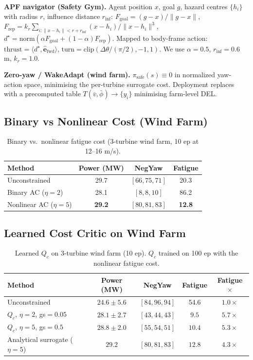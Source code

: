 \documentclass{article}
\begin{document}
\textbf{APF navigator (Safety Gym).}
Agent position $x$, goal $g$, hazard centres $\{h_i\}$ with radius $r$, influence distance $r_{\mathrm{inf}}$:
$F_{\mathrm{goal}}=(g-x)/\|g-x\|$, $F_{\mathrm{rep}}=k_r\sum_{i:\|x-h_i\|<r+r_{\mathrm{inf}}}(x-h_i)/\|x-h_i\|^3$, $d^\star=\mathrm{norm}(\alpha F_{\mathrm{goal}} + (1-\alpha)F_{\mathrm{rep}})$.
Mapped to body-frame action: $\mathrm{thrust}=\langle d^\star,\hat{\mathbf{e}}_{\mathrm{fwd}}\rangle$, $\mathrm{turn}=\mathrm{clip}(\Delta\theta/(\pi/2),-1,1)$.
We use $\alpha\!=\!0.5$, $r_{\mathrm{inf}}\!=\!0.6$ m, $k_r\!=\!1.0$.

\textbf{Zero-yaw / WakeAdapt (wind farm).}
$\pi_{\mathrm{safe}}(s)\equiv 0$ in normalized yaw-action space, minimising the per-turbine surrogate cost.
Deployment replaces with a precomputed table $T(\bar v,\bar\phi)\to\{y_i\}$ minimising farm-level DEL.

\subsection{Binary vs Nonlinear Cost (Wind Farm)}
\label{app:nonlinear}

\begin{table}[h]
\centering
\caption{Binary vs.\ nonlinear fatigue cost (3-turbine wind farm, 10 ep at 12--16 m/s).}
\label{tab:nonlinear}
\begin{tabular}{lccc}
\toprule
Method & Power (MW) & NegYaw & Fatigue \\
\midrule
Unconstrained                & 29.7 & $[66,75,71]$ & 20.3 \\
Binary AC ($\eta\!=\!2$)     & 28.1 & $[8,8,10]$   & 86.2 \\
Nonlinear AC ($\eta\!=\!5$)  & \textbf{29.2} & $[80,81,83]$ & \textbf{12.8} \\
\bottomrule
\end{tabular}
\end{table}

\subsection{Learned Cost Critic on Wind Farm}

\begin{table}[h]
\centering
\caption{Learned $Q_c$ on 3-turbine wind farm (10 ep). $Q_c$ trained on 100 ep with the nonlinear fatigue cost.}
\label{tab:qc_windfarm}
\begin{tabular}{lcccc}
\toprule
Method & Power (MW) & NegYaw & Fatigue & Fatigue $\times$ \\
\midrule
Unconstrained                                & $24.6\!\pm\!5.6$ & $[84,96,94]$ & 54.6 & $1.0\times$ \\
$Q_c$, $\eta\!=\!2$, gs$\!=\!0.05$           & $\mathbf{28.1\!\pm\!2.7}$ & $[43,44,43]$ & $\mathbf{9.5}$ & $5.7\times$ \\
$Q_c$, $\eta\!=\!5$, gs$\!=\!0.5$            & $28.8\!\pm\!2.0$ & $[55,54,51]$ & $10.4$         & $5.3\times$ \\
Analytical surrogate ($\eta\!=\!5$)          & $29.2$ & $[80,81,83]$ & $12.8$ & $4.3\times$ \\
\bottomrule
\end{tabular}
\end{table}
\end{document}
